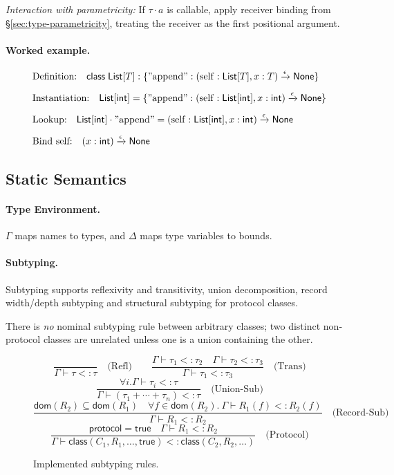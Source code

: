 \emph{Interaction with parametricity:} If $\tau \cdot a$ is callable, apply receiver binding from \S\ref{sec:type-parametricity}, treating the receiver as the first positional argument.

\paragraph{Worked example.}
\[
\begin{aligned}
&\text{Definition:} \quad \mathsf{class}\; \mathsf{List}[T] :
\{\mathrm{"append"} : (\mathrm{self}:\mathsf{List}[T], x:T) \xrightarrow{\epsilon} \mathsf{None} \} \\[0.5em]
&\text{Instantiation:} \quad \mathsf{List}[\mathsf{int}] =
\{\mathrm{"append"} : (\mathrm{self}:\mathsf{List}[\mathsf{int}], x:\mathsf{int}) \xrightarrow{\epsilon} \mathsf{None} \} \\[0.5em]
&\text{Lookup:} \quad \mathsf{List}[\mathsf{int}] \cdot \mathrm{"append"} =
(\mathrm{self}:\mathsf{List}[\mathsf{int}], x:\mathsf{int}) \xrightarrow{\epsilon} \mathsf{None} \\[0.5em]
&\text{Bind self:} \quad (x:\mathsf{int}) \xrightarrow{\epsilon} \mathsf{None}
\end{aligned}
\]

\subsection{Static Semantics}

\paragraph{Type Environment.}  
$\Gamma$ maps names to types, and $\Delta$ maps type variables to bounds.

\paragraph{Subtyping.}  
Subtyping supports reflexivity and transitivity, union decomposition, record width/depth subtyping and structural subtyping for protocol classes.

There is \emph{no} nominal subtyping rule between arbitrary classes; two distinct non‐protocol classes are unrelated unless one is a union containing the other.

\begin{figure*}[t]
\centering
\[
\frac{}{\Gamma \vdash \tau <: \tau} \quad \text{(Refl)}
\qquad
\frac{\Gamma \vdash \tau_1 <: \tau_2 \quad \Gamma \vdash \tau_2 <: \tau_3}{\Gamma \vdash \tau_1 <: \tau_3} \quad \text{(Trans)}
\]
\[
\frac{\forall i. \Gamma \vdash \tau_i <: \tau}{\Gamma \vdash (\tau_1 + \cdots + \tau_n) <: \tau} \quad \text{(Union-Sub)}
\]
\[
\frac{\mathsf{dom}(R_2) \subseteq \mathsf{dom}(R_1) \quad \forall f \in \mathsf{dom}(R_2).\ \Gamma \vdash R_1(f) <: R_2(f)}{\Gamma \vdash R_1 <: R_2} \quad \text{(Record-Sub)}
\]
\[
\frac{\mathsf{protocol} = \mathsf{true} \quad \Gamma \vdash R_1 <: R_2}{\Gamma \vdash \mathsf{class}(C_1, R_1, \ldots, \mathsf{true}) <: \mathsf{class}(C_2, R_2, \ldots)} \quad \text{(Protocol)}
\]
\caption{Implemented subtyping rules.}
\label{fig:subtyping}
\end{figure*}

